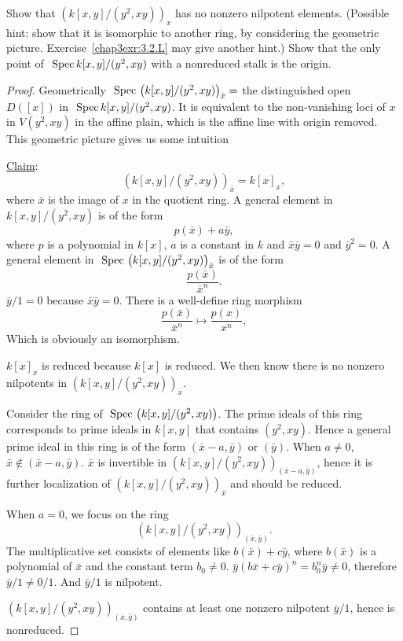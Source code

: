 \documentclass[11pt]{book} %
\begin{document}
\begin{exr}
Show that  $\left(k[x, y]/(y^2, xy)\right)_x$  has no nonzero nilpotent elements.
(Possible hint: show that it is isomorphic to another ring, by considering the geometric picture. Exercise~\ref{chap3exr:3.2.L} may give another hint.) Show that the only point of $\text{ Spec\,} k[x, y]/(y^2 , xy)$ with a nonreduced stalk is the origin.

\end{exr}
\begin{proof}
Geometrically $\text{ Spec\,} \left(k[x, y]/(y^2, xy)\right)_{\bar{x}}=$ the distinguished open $D([x])$ in $\text{ Spec\,} k[x, y]/(y^2, xy)$. It is equivalent to the non-vanishing loci of $x$ in $V(y^2,xy)$ in the affine plain, which is the affine line with origin removed. This geometric picture gives us some intuition

\underline{Claim}:
$$
\left(k[x, y]/(y^2, xy)\right)_{\bar{x}}=k[x]_{x},
$$
where $\bar{x}$ is the image of $x$ in the quotient ring. A general element in $k[x, y]/(y^2, xy)$ is of the form
$$
p(\bar{x})+a\bar{y},
$$
where $p$ is a polynomial in $k[x]$, $a$ is a constant in $k$ and $\bar{x}\bar{y}=0$ and $\bar{y}^2=0$.
A general element in $\text{ Spec\,} \left(k[x, y]/(y^2, xy)\right)_{\bar{x}}$ is of the form
$$
\frac{p(\bar{x})}{\bar{x}^n}.
$$
$\bar{y}/1=0$ because $\bar{x}\bar{y}=0$.
 There is a well-define ring morphism
$$
\frac{p(\bar{x})}{\bar{x}^n}\mapsto \frac{p(x)}{x^n},
$$
Which is obviously an isomorphism.

$k[x]_x$ is reduced because $k[x]$ is reduced. We then know there is no nonzero nilpotents in $\left(k[x, y]/(y^2, xy)\right)_{\bar{x}}$.

Consider the ring of $\text{ Spec\,} \left(k[x, y]/(y^2, xy)\right)$. The prime ideals of this ring corresponds to prime ideals in $k[x,y]$ that contains $(y^2,xy)$. Hence a general prime ideal in this ring is of the form $(\bar{x}-a, \bar{y})$ or $(\bar{y})$. 
When $a\neq 0$, $\bar{x}\notin (\bar{x}-a,\bar{y})$. $\bar{x}$ is invertible in $\left(k[x, y]/(y^2, xy)\right)_{(\bar{x}-a,\bar{y})}$, hence it is further localization of $\left(k[x, y]/(y^2, xy)\right)_{\bar{x}}$ and should be reduced.

When $a=0$, we focus on the ring
$$
\left(k[x, y]/(y^2, xy)\right)_{(\bar{x},\bar{y})}.
$$
The multiplicative set consists of elements like $b(\bar{x})+c\bar{y}$, where $b(\bar{x})$ is a polynomial of $\bar{x}$ and the constant term $b_0\neq 0$. $\bar{y}(b\bar{x}+c\bar{y})^n=b_0^n\bar{y}\neq 0$, therefore $\bar{y}/1\neq 0/1$. And $\bar{y}/1$ is nilpotent.

$\left(k[x, y]/(y^2, xy)\right)_{(\bar{x},\bar{y})}$ contains at least one nonzero nilpotent $\bar{y}/1$, hence is nonreduced.
\end{proof}
\end{document}
